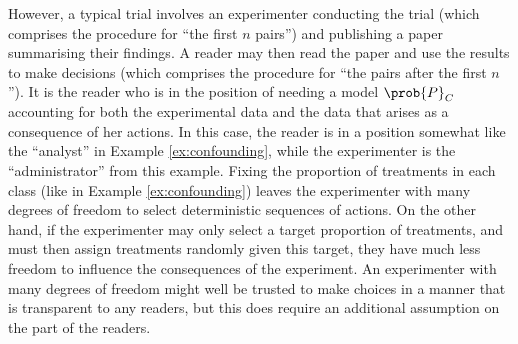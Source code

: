 However, a typical trial involves an experimenter conducting the trial (which comprises the procedure for ``the first $n$ pairs'') and publishing a paper summarising their findings. A reader may then read the paper and use the results to make decisions (which comprises the procedure for ``the pairs after the first $n$''). It is the reader who is in the position of needing a model $\prob{P}_C$ accounting for both the experimental data and the data that arises as a consequence of her actions. In this case, the reader is in a position somewhat like the ``analyst'' in Example \ref{ex:confounding}, while the experimenter is the ``administrator'' from this example. Fixing the proportion of treatments in each class (like in Example \ref{ex:confounding}) leaves the experimenter with many degrees of freedom to select deterministic sequences of actions. On the other hand, if the experimenter may only select a target proportion of treatments, and must then assign treatments randomly given this target, they have much less freedom to influence the consequences of the experiment. An experimenter with many degrees of freedom might well be trusted to make choices in a manner that is transparent to any readers, but this does require an additional assumption on the part of the readers.